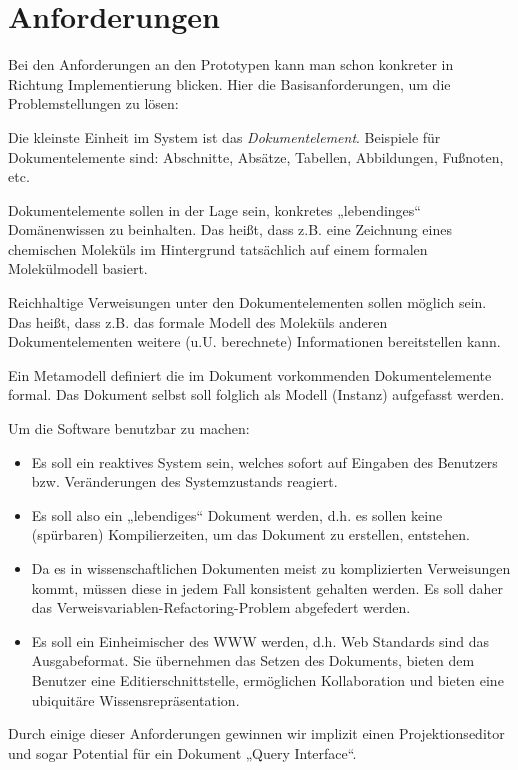 \section{Anforderungen}\label{}
 
Bei den Anforderungen an den Prototypen kann man schon konkreter in Richtung Implementierung blicken. Hier die Basisanforderungen, um die Problemstellungen zu lösen:

 
Die kleinste Einheit im System ist das \emph{Dokumentelement}. Beispiele für Dokumentelemente sind: Abschnitte, Absätze, Tabellen, Abbildungen, Fußnoten, etc.

 
Dokumentelemente sollen in der Lage sein, konkretes „lebendinges“ Domänenwissen zu beinhalten. Das heißt, dass z.B. eine Zeichnung eines chemischen Moleküls im Hintergrund tatsächlich auf einem formalen Molekülmodell basiert.

 
Reichhaltige Verweisungen unter den Dokumentelementen sollen möglich sein. Das heißt, dass z.B. das formale Modell des Moleküls anderen Dokumentelementen weitere (u.U. berechnete) Informationen bereitstellen kann.

 
Ein Metamodell definiert die im Dokument vorkommenden Dokumentelemente formal. Das Dokument selbst soll folglich als Modell (Instanz) aufgefasst werden.

 
Um die Software benutzbar zu machen:

 
\begin{itemize}

\item Es soll ein reaktives System sein, welches sofort auf Eingaben des Benutzers bzw. Veränderungen des Systemzustands reagiert.
\item Es soll also ein „lebendiges“ Dokument werden, d.h. es sollen keine (spürbaren) Kompilierzeiten, um das Dokument zu erstellen, entstehen.
\item Da es in wissenschaftlichen Dokumenten meist zu komplizierten Verweisungen kommt, müssen diese in jedem Fall konsistent gehalten werden. Es soll daher das Verweisvariablen-Refactoring-Problem abgefedert werden.
\item Es soll ein Einheimischer des WWW werden, d.h. Web Standards sind das Ausgabeformat. Sie übernehmen das Setzen des Dokuments, bieten dem Benutzer eine Editierschnittstelle, ermöglichen Kollaboration und bieten eine ubiquitäre Wissensrepräsentation.
\end{itemize}
 
Durch einige dieser Anforderungen gewinnen wir implizit einen Projektionseditor und sogar Potential für ein Dokument „Query Interface“.

